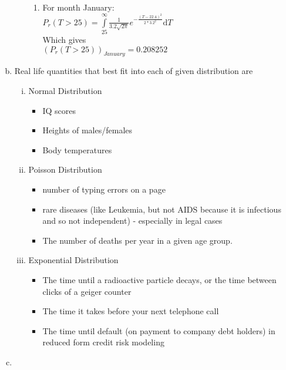 \documentclass{article}
\begin{document}
\begin{enumerate}[(a)]
\begin{enumerate}[(i)]
\begin{enumerate}[]
                \item For month January:\\
                $P_{r}(T>25) = \int\limits_{25}^{\infty} \frac{1}{3.2 \sqrt{2 \pi}}e^{-\frac{(T-22.4)^2}{2*3.2^2}} \mathrm{d} T$\\
                Which gives\\
                $(P_{r}(T>25))_{January} = 0.208252$\\ 
            \end{enumerate}
        \end{enumerate}
    \item Real life quantities that best fit into each of given distribution are
    \begin{enumerate}[(i)]
        \item Normal Distribution
        \begin{itemize}
            \item IQ scores
            \item Heights of males/females
            \item Body temperatures
        \end{itemize}
        \newpage
        \item Poisson Distribution
        \begin{itemize}
            \item number of typing errors on a page
            \item rare diseases (like Leukemia, but not AIDS because it is infectious and so not independent) - especially in legal cases
            \item The number of deaths per year in a given age group.
        \end{itemize}
        \item Exponential Distribution
        \begin{itemize}
            \item The time until a radioactive particle decays, or the time between clicks of a geiger counter
            \item The time it takes before your next telephone call
            \item The time until default (on payment to company debt holders) in reduced form credit risk modeling
        \end{itemize}
    \end{enumerate}
    \item 
\end{enumerate}
\end{document}
